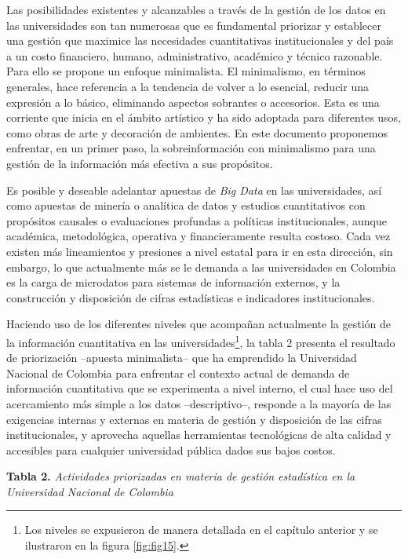 \documentclass[
]{book}
\begin{document}
Las posibilidades existentes y alcanzables a través de la gestión de los datos en las universidades son tan numerosas que es fundamental priorizar y establecer una gestión que maximice las necesidades cuantitativas institucionales y del país a un costo financiero, humano, administrativo, académico y técnico razonable. Para ello se propone un enfoque minimalista. El minimalismo, en términos generales, hace referencia a la tendencia de volver a lo esencial, reducir una expresión a lo básico, eliminando aspectos sobrantes o accesorios. Esta es una corriente que inicia en el ámbito artístico y ha sido adoptada para diferentes usos, como obras de arte y decoración de ambientes. En este documento proponemos enfrentar, en un primer paso, la sobreinformación con minimalismo para una gestión de la información más efectiva a sus propósitos.

Es posible y deseable adelantar apuestas de \emph{Big Data} en las universidades, así como apuestas de minería o analítica de datos y estudios cuantitativos con propósitos causales o evaluaciones profundas a políticas institucionales, aunque académica, metodológica, operativa y financieramente resulta costoso. Cada vez existen más lineamientos y presiones a nivel estatal para ir en esta dirección, sin embargo, lo que actualmente más se le demanda a las universidades en Colombia es la carga de microdatos para sistemas de información externos, y la construcción y disposición de cifras estadísticas e indicadores institucionales.

Haciendo uso de los diferentes niveles que acompañan actualmente la gestión de la información cuantitativa en las universidades\footnote{Los niveles se expusieron de manera detallada en el capítulo anterior y se ilustraron en la figura \ref{fig:fig15}.}, la tabla 2 presenta el resultado de priorización --apuesta minimalista-- que ha emprendido la Universidad Nacional de Colombia para enfrentar el contexto actual de demanda de información cuantitativa que se experimenta a nivel interno, el cual hace uso del acercamiento más simple a los datos --descriptivo--, responde a la mayoría de las exigencias internas y externas en materia de gestión y disposición de las cifras institucionales, y aprovecha aquellas herramientas tecnológicas de alta calidad y accesibles para cualquier universidad pública dados sus bajos costos.

\textbf{Tabla 2.} \emph{Actividades priorizadas en materia de gestión estadística en la Universidad Nacional de Colombia}
\end{document}
